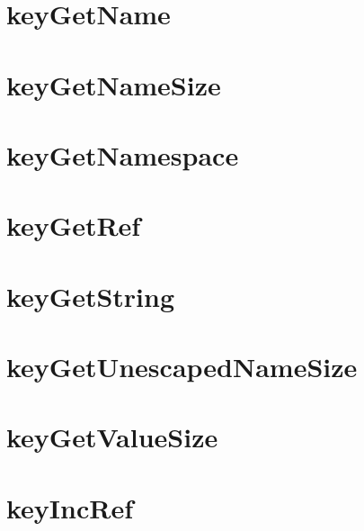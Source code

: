\let\mypdfximage\pdfximage\def\pdfximage{\immediate\mypdfximage}\documentclass[twoside]{book}
\newcommand{\+}{\discretionary{\mbox{\scriptsize$\hookleftarrow$}}{}{}}
\begin{document}
\chapter{key\+Get\+Name}
\label{doc_contrib_api_reviews_core_keyGetName_md}

\chapter{key\+Get\+Name\+Size}
\label{doc_contrib_api_reviews_core_keyGetNameSize_md}

\chapter{key\+Get\+Namespace}
\label{doc_contrib_api_reviews_core_keyGetNamespace_md}

\chapter{key\+Get\+Ref}
\label{doc_contrib_api_reviews_core_keyGetRef_md}

\chapter{key\+Get\+String}
\label{doc_contrib_api_reviews_core_keyGetString_md}

\chapter{key\+Get\+Unescaped\+Name\+Size}
\label{doc_contrib_api_reviews_core_keyGetUnescapedNameSize_md}

\chapter{key\+Get\+Value\+Size}
\label{doc_contrib_api_reviews_core_keyGetValueSize_md}

\chapter{key\+Inc\+Ref}
\label{doc_contrib_api_reviews_core_keyIncRef_md}

\end{document}
